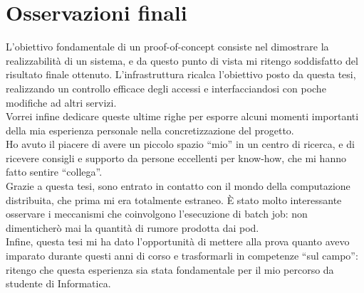 \section{Osservazioni finali}
L'obiettivo fondamentale di un proof-of-concept consiste nel dimostrare la realizzabilità 
di un sistema, e da questo punto di vista mi ritengo soddisfatto del risultato finale ottenuto. L'infrastruttura ricalca l'obiettivo 
posto da questa tesi, realizzando un controllo efficace degli accessi e interfacciandosi 
con poche modifiche ad altri servizi.  
\\Vorrei infine dedicare queste ultime righe per esporre alcuni momenti importanti della mia esperienza personale nella concretizzazione del progetto. 
\\ Ho avuto il piacere di avere un piccolo spazio “mio” in un centro di ricerca, e di ricevere consigli e supporto da persone eccellenti per know-how, che mi hanno fatto sentire “collega”.
\\ Grazie a questa tesi, sono entrato in contatto con il mondo della computazione distribuita, che prima mi era totalmente estraneo. 
È stato molto interessante osservare i meccanismi che coinvolgono l'esecuzione di batch job: non dimenticherò mai 
la quantità di rumore prodotta dai pod.   
\\ Infine, questa tesi mi ha dato l'opportunità di mettere alla prova quanto avevo
imparato durante questi anni di corso e trasformarli in competenze “sul campo”:
 ritengo che questa esperienza sia stata fondamentale per il mio percorso da studente di Informatica.  